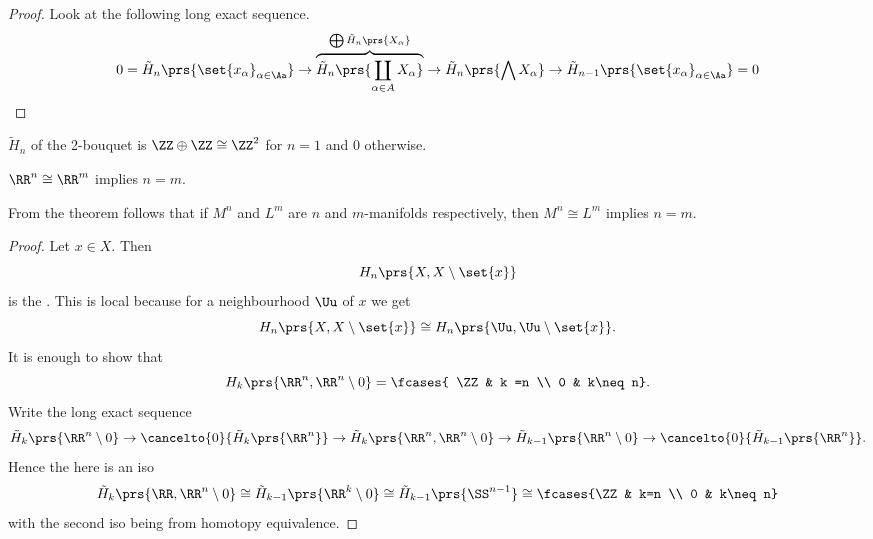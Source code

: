 \documentclass[10pt,a4paper,twoside,openany,hidelinks]{book}
\newcommand{\ra}{\rightarrow}
\begin{document}
\begin{proof}
Look at the following long exact sequence.
\[0 = \tilde{H}_n\prs{\set{x_{\alpha}}_{\alpha \in \Aa}} \ra \overset{\bigoplus \tilde{H}_n\prs{X_{\alpha}}}{\overbrace{\tilde{H}_n\prs{\coprod_{\alpha \in A} X_{\alpha}}}} \ra \tilde{H}_n\prs{\bigwedge X_{\alpha}} \ra \tilde{H}_{n-1} \prs{\set{x_{\alpha}}_{\alpha \in \Aa}} = 0\]
\end{proof}
\begin{example}
$\tilde{H}_n$ of the 2-bouquet is $\ZZ \oplus \ZZ \cong \ZZ^2$ for $n=1$ and $0$ otherwise.
\end{example}
\begin{theorem}
$\RR^n \cong \RR^m$ implies $n=m$.
\end{theorem}
\begin{remark}
From the theorem follows that if $M^n$ and $L^m$ are $n$ and $m$-manifolds respectively, then $M^n \cong L^m$ implies $n=m$.
\end{remark}
\begin{proof}
Let $x \in X$. Then
\[H_n\prs{X, X \setminus \set{x}}\] is the . This is local because for a neighbourhood $\Uu$ of $x$ we get \[H_n\prs{X, X \setminus \set{x}}\cong H_n\prs{\Uu, \Uu\setminus \set{x}}\text{.}\]
It is enough to show that \[H_k\prs{\RR^n, \RR^n \setminus 0} = \fcases{ \ZZ & k =n \\ 0 & k\neq n}\text{.}\]
Write the long exact sequence
\[\tilde{H}_k\prs{\RR^n \setminus 0} \ra \cancelto{0}{\tilde{H}_k \prs{\RR^n}} \ra \tilde{H}_k\prs{\RR^n, \RR^n \setminus 0} \ra \tilde{H}_{k-1}\prs{\RR^n \setminus 0} \ra \cancelto{0}{\tilde{H}_{k-1}\prs{\RR^n}} \text{.}\]
Hence the here is an iso
\[\tilde{H}_k\prs{\RR, \RR^n \setminus 0} \cong \tilde{H}_{k-1}\prs{\RR^k \setminus 0} \cong \tilde{H}_{k-1}\prs{\SS^{n-1}} \cong \fcases{\ZZ & k=n \\ 0 & k\neq n}\]
with the second iso being from homotopy equivalence.
\end{proof}
\end{document}
